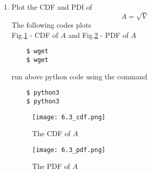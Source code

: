 \documentclass[journal,12pt,twocolumn]{IEEEtran}
\renewcommand\thesection{\arabic{section}}
\begin{document}
\begin{enumerate}[label=\thesection.\arabic*
,ref=\thesection.\theenumi]
%
\item
\label{ch3_raleigh_sim}
Plot the CDF and PDf of
%
\begin{equation}
A = \sqrt{V}
\end{equation}
%
\solution The following codes plots\\
 Fig.\ref{fig:6.3_cdf} - CDF of $A$ and Fig.\ref{fig:6.3_pdf} - PDF of $A$
\begin{lstlisting}
    $ wget 
    $ wget 
\end{lstlisting}
run above python code using the command
\begin{lstlisting}
    $ python3 
    $ python3 
\end{lstlisting}
\begin{figure}[h]
    \centering
    \texttt{[image: 6.3\_cdf.png]}
    \caption{The CDF of $A$}
    \label{fig:6.3_cdf}
\end{figure}
\begin{figure}[h]
    \centering
    \texttt{[image: 6.3\_pdf.png]}
    \caption{The PDF of $A$}
    \label{fig:6.3_pdf}
\end{figure}


\end{enumerate}
\end{document}
